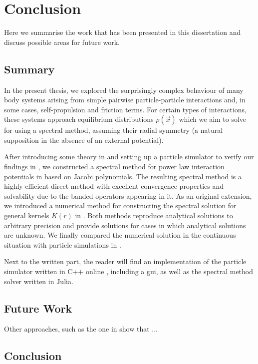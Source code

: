 \chapter{Conclusion}
\label{chap:conclusion}

Here we summarise the work that has been presented in this dissertation and discuss possible areas for future work.

\section{Summary}

In the present thesis, we explored the surprisingly complex behaviour of many body systems arising from simple pairwise particle-particle interactions and, in some cases, self-propulsion and friction terms.
For certain types of interactions, these systems approach equilibrium distributions $\rho(\vec{x})$ which we aim to solve for using a spectral method, assuming their radial symmetry (a natural supposition in the absence of an external potential).

After introducing some theory in  and setting up a particle simulator to verify our findings in , we constructed a spectral method for power law interaction potentials in  based on Jacobi polynomials.
The resulting spectral method is a highly efficient direct method with excellent convergence properties and solvability due to the banded operators appearing in it.
As an original extension, we introduced a numerical method for constructing the spectral solution for general kernels $K(r)$ in .
Both methods reproduce analytical solutions to arbitrary precision and provide solutions for cases in which analytical solutions are unknown.
We finally compared the numerical solution in the continuous situation with particle simulations in .

Next to the written part, the reader will find an implementation of the particle simulator written in C++ online \parencite{2023-my-dissertation}, including a \gls{gui}, as well as the spectral method solver written in Julia.

\section{Future Work}
Other approaches, such as the one in \cite{2015-spectral-method-for-boltzmann-equation} show that ...
\hierKoennteIhreWerbungStehen

\section{Conclusion}
\hierKoennteIhreWerbungStehen
